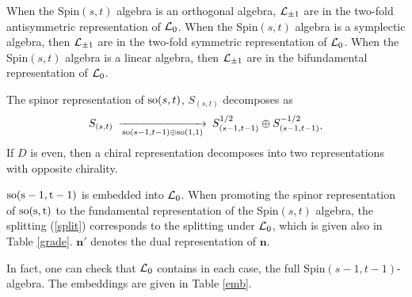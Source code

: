 \documentclass[a4paper,12pt]{article}
\begin{document}
When the Spin$(s,t)$ algebra is an orthogonal algebra,
$\mathcal{L}_{\pm1}$ are in the two-fold antisymmetric  representation of
$\mathcal{L}_0$. When the Spin$(s,t)$ algebra is a symplectic algebra,
then $\mathcal{L}_{\pm1}$ are in the two-fold symmetric representation of
$\mathcal{L}_0$. When the Spin$(s,t)$ algebra is a linear algebra, then
$\mathcal{L}_{\pm1}$ are in the bifundamental  representation of $\mathcal{L}_0$.

\smallskip

The spinor representation of ${\rm so}(s,t)$, $S_{(s,t)}$
decomposes as \begin{equation}
\begin{CD}S_{(s,t)}@>>{\rm so}(s-1,t-1)\oplus{\rm
so}(1,1)>S_{(s-1,t-1)}^{1/2}\oplus
S_{(s-1,t-1)}^{-1/2}\end{CD}.\label{split}\end{equation}  If $D$
is even, then a chiral representation decomposes into two
representations with opposite chirality.

$\rm{so}(s-1,t-1)$ is embedded into  $\mathcal{L}_0$. When promoting the
spinor representation of $\rm{so}(s,t)$ to the fundamental
representation of the Spin$(s,t)$ algebra, the splitting
(\ref{split}) corresponds to  the  splitting under $\mathcal{L}_0$, which
is given also in Table \ref{grade}. $\mathbf{n'}$ denotes the dual
representation of $\mathbf{n}$.

In fact, one can check that $\mathcal{L}_0$ contains in each case, the
full Spin$(s-1,t-1)$-algebra. The embeddings are given in Table
\ref{emb}.
\end{document}
